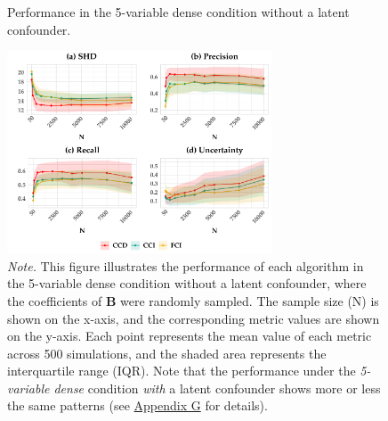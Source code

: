 \documentclass[twoside, 11pt]{article}
\begin{document}
\begin{figure}[!t]
    \centering
        \caption{Performance in the 5-variable dense condition without a latent confounder.}
        \vspace{1mm}
        \includegraphics[width=0.7\textwidth]{figures/samplingbeta_dense5p.pdf}
        \caption*{\small{\textit{Note.} This figure illustrates the performance of each algorithm in the 5-variable dense condition without a latent confounder, where the coefficients of $\mathbf{B}$ were randomly sampled. The sample size (N) is shown on the x-axis, and the corresponding metric values are shown on the y-axis. Each point represents the mean value of each metric across 500 simulations, and the shaded area represents the interquartile range (IQR). Note that the performance under the \textit{5-variable dense} condition \textit{with} a latent confounder shows more or less the same patterns (see \hyperref[varyingbeta]{Appendix G} for details).}}
    \label{fig:5pdense}
\vspace{-3mm}
\end{figure}
\end{document}
